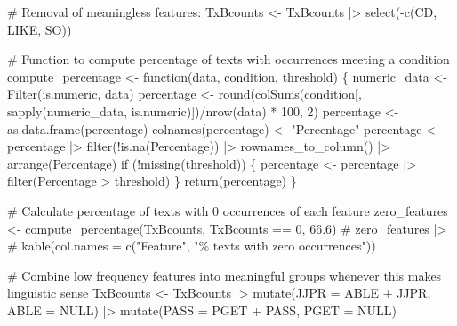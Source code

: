 \documentclass[
  letterpaper,
  DIV=11,
  numbers=noendperiod]{scrreprt}
\newenvironment{Shaded}{\begin{snugshade}}{\end{snugshade}}
\newcommand{\AttributeTok}[1]{\textcolor[rgb]{0.40,0.45,0.13}{#1}}
\newcommand{\CommentTok}[1]{\textcolor[rgb]{0.37,0.37,0.37}{#1}}
\newcommand{\ConstantTok}[1]{\textcolor[rgb]{0.56,0.35,0.01}{#1}}
\newcommand{\ControlFlowTok}[1]{\textcolor[rgb]{0.00,0.23,0.31}{#1}}
\newcommand{\DecValTok}[1]{\textcolor[rgb]{0.68,0.00,0.00}{#1}}
\newcommand{\FloatTok}[1]{\textcolor[rgb]{0.68,0.00,0.00}{#1}}
\newcommand{\FunctionTok}[1]{\textcolor[rgb]{0.28,0.35,0.67}{#1}}
\newcommand{\NormalTok}[1]{\textcolor[rgb]{0.00,0.23,0.31}{#1}}
\newcommand{\OtherTok}[1]{\textcolor[rgb]{0.00,0.23,0.31}{#1}}
\newcommand{\SpecialCharTok}[1]{\textcolor[rgb]{0.37,0.37,0.37}{#1}}
\newcommand{\StringTok}[1]{\textcolor[rgb]{0.13,0.47,0.30}{#1}}
\begin{document}
\begin{Shaded}
\begin{Highlighting}[]
\CommentTok{\# Removal of meaningless features:}
\NormalTok{TxBcounts }\OtherTok{\textless{}{-}}\NormalTok{ TxBcounts }\SpecialCharTok{|\textgreater{}}  
  \FunctionTok{select}\NormalTok{(}\SpecialCharTok{{-}}\FunctionTok{c}\NormalTok{(CD, LIKE, SO))}

\CommentTok{\# Function to compute percentage of texts with occurrences meeting a condition}
\NormalTok{compute\_percentage }\OtherTok{\textless{}{-}} \ControlFlowTok{function}\NormalTok{(data, condition, threshold) \{}
\NormalTok{  numeric\_data }\OtherTok{\textless{}{-}} \FunctionTok{Filter}\NormalTok{(is.numeric, data)}
\NormalTok{  percentage }\OtherTok{\textless{}{-}} \FunctionTok{round}\NormalTok{(}\FunctionTok{colSums}\NormalTok{(condition[, }\FunctionTok{sapply}\NormalTok{(numeric\_data, is.numeric)])}\SpecialCharTok{/}\FunctionTok{nrow}\NormalTok{(data) }\SpecialCharTok{*} \DecValTok{100}\NormalTok{, }\DecValTok{2}\NormalTok{)}
\NormalTok{  percentage }\OtherTok{\textless{}{-}} \FunctionTok{as.data.frame}\NormalTok{(percentage)}
  \FunctionTok{colnames}\NormalTok{(percentage) }\OtherTok{\textless{}{-}} \StringTok{"Percentage"}
\NormalTok{  percentage }\OtherTok{\textless{}{-}}\NormalTok{ percentage }\SpecialCharTok{|\textgreater{}}  
    \FunctionTok{filter}\NormalTok{(}\SpecialCharTok{!}\FunctionTok{is.na}\NormalTok{(Percentage)) }\SpecialCharTok{|\textgreater{}} 
    \FunctionTok{rownames\_to\_column}\NormalTok{() }\SpecialCharTok{|\textgreater{}} 
    \FunctionTok{arrange}\NormalTok{(Percentage)}
  \ControlFlowTok{if}\NormalTok{ (}\SpecialCharTok{!}\FunctionTok{missing}\NormalTok{(threshold)) \{}
\NormalTok{    percentage }\OtherTok{\textless{}{-}}\NormalTok{ percentage }\SpecialCharTok{|\textgreater{}}  
      \FunctionTok{filter}\NormalTok{(Percentage }\SpecialCharTok{\textgreater{}}\NormalTok{ threshold)}
\NormalTok{  \}}
  \FunctionTok{return}\NormalTok{(percentage)}
\NormalTok{\}}

\CommentTok{\# Calculate percentage of texts with 0 occurrences of each feature}
\NormalTok{zero\_features }\OtherTok{\textless{}{-}} \FunctionTok{compute\_percentage}\NormalTok{(TxBcounts, TxBcounts }\SpecialCharTok{==} \DecValTok{0}\NormalTok{, }\FloatTok{66.6}\NormalTok{)}
\CommentTok{\# zero\_features |\textgreater{} }
\CommentTok{\#   kable(col.names = c("Feature", "\% texts with zero occurrences"))}

\CommentTok{\# Combine low frequency features into meaningful groups whenever this makes linguistic sense}
\NormalTok{TxBcounts }\OtherTok{\textless{}{-}}\NormalTok{ TxBcounts }\SpecialCharTok{|\textgreater{}}  
  \FunctionTok{mutate}\NormalTok{(}\AttributeTok{JJPR =}\NormalTok{ ABLE }\SpecialCharTok{+}\NormalTok{ JJPR, }\AttributeTok{ABLE =} \ConstantTok{NULL}\NormalTok{) }\SpecialCharTok{|\textgreater{}}  
  \FunctionTok{mutate}\NormalTok{(}\AttributeTok{PASS =}\NormalTok{ PGET }\SpecialCharTok{+}\NormalTok{ PASS, }\AttributeTok{PGET =} \ConstantTok{NULL}\NormalTok{)}


\end{Highlighting}
\end{Shaded}
\end{document}
